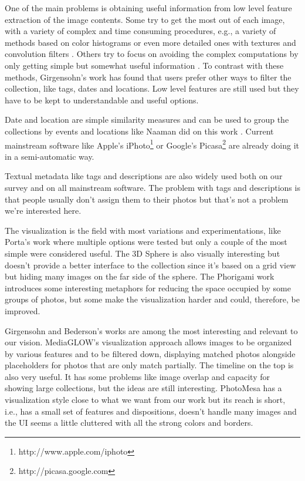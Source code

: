 One of the main problems is obtaining useful information from low level feature extraction of the image contents. Some try to get the most out of each image, with a variety of complex and time consuming procedures, e.g., a variety of methods based on color histograms \cite{Strong:2009p413,Tan:2001p850,Chen:1998p2344,Schaefer:2010p1871} or even more detailed ones with textures and convolution filters \cite{Heesch:2004p2675}. Others try to focus on avoiding the complex computations by only getting simple but somewhat useful information \cite{Qiu:2007p1207}. To contrast with these methods, Girgensohn's work \cite{Girgensohn:2010} has found that users prefer other ways to filter the collection, like tags, dates and locations. Low level features are still used but they have to be kept to understandable and useful options.

Date and location are simple similarity measures and can be used to group the collections by events and locations like Naaman did on this work \cite{Naaman:2004p1802}. Current mainstream software like Apple's iPhoto\footnote{http://www.apple.com/iphoto} or Google's Picasa\footnote{http://picasa.google.com} are already doing it in a semi-automatic way.

Textual metadata like tags and descriptions are also widely used both on our survey \cite{Rodden:2001p731,Girgensohn:2010,Heesch:2004p2675,Bederson:2001:PZI:502348.502359} and on all mainstream software. The problem with tags and descriptions is that people usually don't assign them to their photos but that's not a problem we're interested here.

The visualization is the field with most variations and experimentations, like Porta's work \cite{Porta:2006p416} where multiple options were tested but only a couple of the most simple were considered useful. The 3D Sphere \cite{Schaefer:2010p1871} is also visually interesting but doesn't provide a better interface to the collection since it's based on a grid view but hiding many images on the far side of the sphere. The Phorigami work \cite{Hsu:2009p2696} introduces some interesting metaphors for reducing the space occupied by some groups of photos, but some make the visualization harder and could, therefore, be improved.

Girgensohn and Bederson's works are among the most interesting and relevant to our vision. MediaGLOW's \cite{Girgensohn:2010} visualization approach allows images to be organized by various features and to be filtered down, displaying matched photos alongside placeholders for photos that are only match partially. The timeline on the top is also very useful. It has some problems like image overlap and capacity for showing large collections, but the ideas are still interesting. PhotoMesa \cite{Bederson:2001:PZI:502348.502359} has a visualization style close to what we want from our work but its reach is short, i.e., has a small set of features and dispositions, doesn't handle many images and the \ac{UI} seems a little cluttered with all the strong colors and borders.

